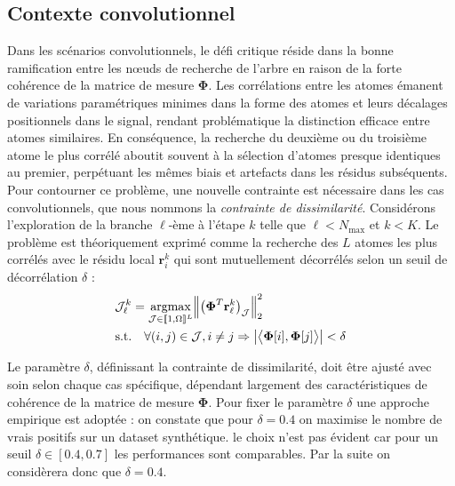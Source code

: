 \documentclass[9pt,a4paper,twoside]{rho}
\begin{document}

\subsection{Contexte convolutionnel}
Dans les scénarios convolutionnels, le défi critique réside dans la bonne ramification entre les nœuds de recherche de l'arbre en raison de la forte cohérence de la matrice de mesure $\boldsymbol{\Phi}$. Les corrélations entre les atomes émanent de variations paramétriques minimes dans la forme des atomes et leurs décalages positionnels dans le signal, rendant problématique la distinction efficace entre atomes similaires. En conséquence, la recherche du deuxième ou du troisième atome le plus corrélé aboutit souvent à la sélection d'atomes presque identiques au premier, perpétuant les mêmes biais et artefacts dans les résidus subséquents. Pour contourner ce problème, une nouvelle contrainte est nécessaire dans les cas convolutionnels, que nous nommons la \textit{contrainte de dissimilarité}. Considérons l'exploration de la branche $\ell$-ème à l'étape $k$ telle que $\ell < N_{\text{max}}$ et $k < K$. Le problème est théoriquement exprimé comme la recherche des $L$ atomes les plus corrélés avec le résidu local $\mathbf{r}_i^k$ qui sont mutuellement décorrélés selon un seuil de décorrélation $\delta$ :
\begin{align}
    \mathcal{J}_{\ell}^k &= \underset{\mathcal{J} \in \llbracket 1, \Omega \rrbracket^L}{\operatorname{argmax}} \Big\| \big( \boldsymbol{\Phi}^T  \mathbf{r}_{\ell}^k \big)_\mathcal{J} \Big\|_2^2 \notag \\
    \text{s.t.} &\quad \forall (i, j) \in \mathcal{J}, i \neq j \Rightarrow \big | \big \langle \boldsymbol{\Phi}[i],  \boldsymbol{\Phi}[j] \big \rangle \big | < \delta
    \label{eq:dissimilarity}
\end{align}

Le paramètre \(\delta\), définissant la contrainte de dissimilarité, doit être ajusté avec soin selon chaque cas spécifique, dépendant largement des caractéristiques de cohérence de la matrice de mesure \(\boldsymbol{\Phi}\). Pour fixer le paramètre $\delta$ une approche empirique est adoptée : on constate que pour $\delta = 0.4$ on maximise le nombre de vrais positifs sur un dataset synthétique. le choix n'est pas évident car pour un seuil $\delta \in [0.4, 0.7]$ les performances sont comparables. Par la suite on considèrera donc que $\delta = 0.4$.
\end{document}
